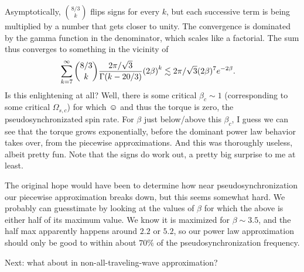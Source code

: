 \documentclass[11pt,
        usenames, %
        dvipsnames %
    ]{article}
\DeclarePairedDelimiter\p{\lparen}{\rparen}
\begin{document}
Asymptotically, $\binom{8/3}{k}$ flips signs for every $k$, but each successive
term is being multiplied by a number that gets closer to unity. The convergence
is dominated by the gamma function in the denominator, which scales like a
factorial. The sum thus converges to something in the vicinity of
\begin{align}
    \sum\limits_{k = 7}^\infty \binom{8/3}{k}
            \frac{2\pi/\sqrt{3}}{\Gamma\p*{k - 20/3}}\p*{2\beta}^k
        &\lesssim 2\pi/\sqrt{3}(2\beta)^7 e^{-2\beta}.
\end{align}
Is this enlightening at all? Well, there is some critical $\beta_c \sim 1$
(corresponding to some critical $\Omega_{s,c}$) for which $\smiley$ and thus the
torque is zero, the pseudosynchronizated spin rate. For $\beta$ just below/above
this $\beta_c$, I guess we can see that the torque grows exponentially, before
the dominant power law behavior takes over, from the piecewise approximations.
And this was thoroughly useless, albeit pretty fun. Note that the signs do work
out, a pretty big surprise to me at least.

The original hope would have been to determine how near pseudosynchronization
our piecewise approximation breaks down, but this seems somewhat hard. We
probably can guesstimate by looking at the values of $\beta$ for which the above
is either half of its maximum value. We know it is maximized for $\beta \sim
3.5$, and the half max apparently happens around $2.2$ or $5.2$, so our power
law approximation should only be good to within about $70\%$ of the
pseudosynchronization frequency.

Next: what about in non-all-traveling-wave approximation?
\end{document}
